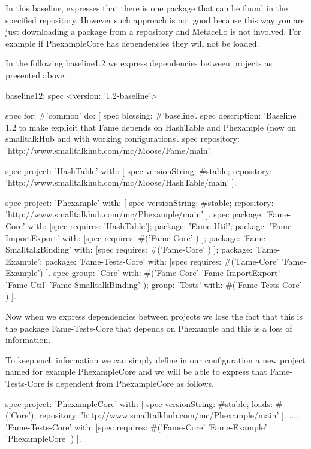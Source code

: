 \documentclass[a4paper,10pt,twoside]{book}
\begin{document}
In this baseline, 
expresses that there is one package that can be found in the specified repository.
However such approach is not good because this way you are just downloading a package from a repository and Metacello is not involved. For example if PhexampleCore has dependencies they will not be loaded.

In the following baseline1.2 we express dependencies between projects as presented above.
\begin{code}{}
baseline12: spec
	<version: '1.2-baseline'>

	spec for: #'common' do: [
		spec blessing: #'baseline'.
		spec description: 'Baseline 1.2 to make explicit that Fame depends on HashTable and Phexample (now on smalltalkHub and with working configurations'.
		spec repository: 'http://www.smalltalkhub.com/mc/Moose/Fame/main'.
		
		spec project: 'HashTable' with: [
				spec
					versionString: #stable;
					repository: 'http://www.smalltalkhub.com/mc/Moose/HashTable/main' ].
				
		spec project: 'Phexample' with: [
				spec
					versionString: #stable;
					repository: 'http://www.smalltalkhub.com/mc/Phexample/main' ].		
		spec 
			package: 'Fame-Core' with: [spec requires: 'HashTable'];
			package: 'Fame-Util';
			package: 'Fame-ImportExport' with: [spec requires: #('Fame-Core' ) ];
			package: 'Fame-SmalltalkBinding' with: [spec requires: #('Fame-Core' ) ];
			package: 'Fame-Example';
			package: 'Fame-Tests-Core' with: [spec requires: #('Fame-Core' 'Fame-Example') ].
		spec 
			group: 'Core' with: #('Fame-Core' 'Fame-ImportExport' 'Fame-Util' 'Fame-SmalltalkBinding' );
			group: 'Tests' with: #('Fame-Tests-Core' ) ].
\end{code}

Now when we express dependencies between projects we lose the fact that this is the package Fame-Tests-Core that depends on Phexample and this is a loss of information. 

To keep such information we can simply define in our configuration a new project named for example PhexampleCore and we will be able to express that Fame-Tests-Core is dependent from PhexampleCore as follows. 


\begin{code}{}
spec 
	project: 'PhexampleCore' 
	with: [ spec
               versionString: #stable;
               loads: #('Core');
               repository: 'http://www.smalltalkhub.com/mc/Phexample/main' ].
	....
	'Fame-Tests-Core' with: [spec requires: #('Fame-Core' 'Fame-Example' 'PhexampleCore' ) ].
\end{code}
\end{document}
